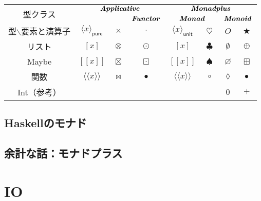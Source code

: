 \documentclass[a5paper,draft]{jsbook}
\def\[{\left[\!\left[}
\def\]{\right]\!\right]}
\newcommand{\programminglanguage}[1]{\textsf{#1}}
\newcommand{\haskell}{\programminglanguage{Haskell}}
\newcommand{\mathTypeParameterClass}[1]{\textbf{\emph{#1}}}
\newcommand{\mathTypeClass}[1]{\textbf{\emph{#1}}} %
\newcommand{\mathAnonymousParameter}{\lozenge}
\newcommand{\mathBinaryOperator}[1]{\operatorname{#1}}
\newcommand{\mathAnyBinaryOperator}{\mathBinaryOperator{\bigstar}}
\newcommand{\mathAppend}{\oplus}
\newcommand{\mathCompose}{\mathBinaryOperator{\bullet}}
\DeclareMathOperator{\hsklApplicativeMap}{\times}
\DeclareMathOperator{\hsklApplicativeListMap}{\otimes}
\DeclareMathOperator{\hsklApplicativeMaybeMap}{\boxtimes}
\DeclareMathOperator{\hsklFmap}{\cdot}
\DeclareMathOperator{\hsklMap}{\odot}
\DeclareMathOperator{\hsklMaybeAppend}{\boxplus}
\DeclareMathOperator{\hsklMaybeMap}{\boxdot}
\DeclareMathOperator{\hsklMonadMap}{\heartsuit}
\newcommand{\hsklEmptyList}{\emptyset}
\newcommand{\hsklNothing}{\varnothing}
\newcommand{\hsklApplicative}{\mathTypeParameterClass{Applicative}}
\newcommand{\hsklFunctor}{\mathTypeParameterClass{Functor}}
\newcommand{\hsklMonad}{\mathTypeParameterClass{Monad}}
\newcommand{\hsklMonadplus}{\mathTypeParameterClass{Monadplus}}
\newcommand{\hsklJust}[1]{\[#1\]}
\newcommand{\hsklPure}[1]{\langle#1\rangle_\textsf{pure}}
\newcommand{\hsklUnit}[1]{\langle#1\rangle_\textsf{unit}}
\begin{document}
\begin{table*}
\begin{center}
\begin{tabular}{||c||c|c|c|c|c|c|c||}
\hline
\multirow{2}{*}{型クラス}
    &\multicolumn{3}{|c|}{$\hsklApplicative$}
    &\multicolumn{4}{|c||}{$\hsklMonadplus$}\\
\cline{4-8}
\multirow{1}{*}{}
    &\multicolumn{2}{|c|}{ }
    &$\hsklFunctor$
    &\multicolumn{2}{|c}{$\hsklMonad$}
    &\multicolumn{2}{|c||}{$\mathTypeClass{Monoid}$}\\
\hline\hline
型$\backslash$要素と演算子
    &$\hsklPure{x}$
    &$\hsklApplicativeMap$
    &$\hsklFmap$
    &$\hsklUnit{x}$
    &$\hsklMonadMap$
    &$O$
    &$\mathAnyBinaryOperator$\\
\hline
リスト
    &$[x]$
    &$\hsklApplicativeListMap$
    &$\hsklMap$
    &$[x]$
    &$\clubsuit$
    &$\hsklEmptyList$
    &$\mathAppend$\\
\hline
Maybe
    &$\hsklJust{x}$
    &$\hsklApplicativeMaybeMap$
    &$\hsklMaybeMap$
    &$\hsklJust{x}$
    &$\spadesuit$
    &$\hsklNothing$
    &$\hsklMaybeAppend$\\
\hline
関数
    &$\langle\!\langle x\rangle\!\rangle$
    &$\bowtie$
    &$\mathCompose$
    &$\langle\!\langle x\rangle\!\rangle$
    &$\circ$
    &$\mathAnonymousParameter$
    &$\mathCompose$\\
\hline
Int（参考）
    &
    &
    &
    &
    &
    &$0$
    &$+$\\
\hline
\end{tabular}
\end{center}
\end{table*}

\section{\haskell のモナド}


\section{余計な話：モナドプラス}

\chapter{IO}
\end{document}

